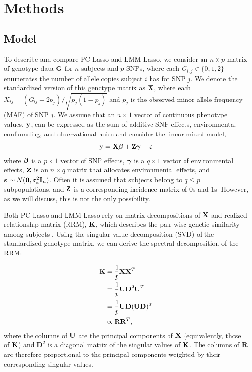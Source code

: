 \section{Methods} \label{sec:methods}



\subsection{Model}


To describe and compare PC-Lasso and LMM-Lasso, we consider an $n \times p$ matrix of genotype data $\boldsymbol{G}$ for $n$ subjects and $p$ SNPs, where each $G_{i,j} \in \{ 0, 1, 2 \}$ enumerates the number of allele copies subject $i$ has for SNP $j$. We denote the standardized version of this genotype matrix as $\textbf{X}$, where each $X_{ij} = (G_{ij} - 2 p_j) / \sqrt{p_j (1 - p_j)}$ and $p_j$ is the observed minor allele frequency (MAF) of SNP $j$. We assume that an $n \times 1$ vector of continuous phenotype values, $\textbf{y}$, can be expressed as the sum of additive SNP effects, environmental confounding, and observational noise and consider the linear mixed model,
\begin{equation}
    \label{eqn:model}
    \textbf{y} = \textbf{X}\boldsymbol{\beta} + \textbf{Z}\boldsymbol{\gamma} + \boldsymbol{\varepsilon}
\end{equation}
where $\boldsymbol{\beta}$ is a $p \times 1$ vector of SNP effects, $\boldsymbol{\gamma}$ is a $q \times 1$ vector of environmental effects, $\textbf{Z}$ is an $n \times q$ matrix that allocates environmental effects, and $\boldsymbol{\varepsilon} \sim N(\boldsymbol{0}, \sigma^2_e \textbf{I}_n)$. Often it is assumed that subjects belong to $q \le p$ subpopulations, and $\textbf{Z}$ is a corresponding incidence matrix of 0s and 1s. However, as we will discuss, this is not the only possibility.

Both PC-Lasso and LMM-Lasso rely on matrix decompositions of $\textbf{X}$ and realized relationship matrix (RRM), $\textbf{K}$, which describes the pair-wise genetic similarity among subjects \cite{hayes2009increased}. Using the singular value decomposition (SVD) of the standardized genotype matrix, we can derive the spectral decomposition of the RRM: 

\begin{align}
    \label{eqn:k}
    \textbf{K} &= \frac{1}{p} \textbf{X} \textbf{X}^T \nonumber \\
                   &= \frac{1}{p} \textbf{U} \textbf{D}^2 \textbf{U}^T \nonumber \\
                   &= \frac{1}{p} \textbf{U} \textbf{D} (\textbf{U} \textbf{D})^T \nonumber \\
                   &\propto \textbf{R} \textbf{R}^T,
\end{align}
where the columns of $\textbf{U}$ are the principal components of $\textbf{X}$ (equivalently, those of $\textbf{K}$) and $\boldsymbol{D}^2$ is a diagonal matrix of the singular values of $\textbf{K}$. The columns of $\boldsymbol{R}$ are therefore proportional to the principal components weighted by their corresponding singular values. 

